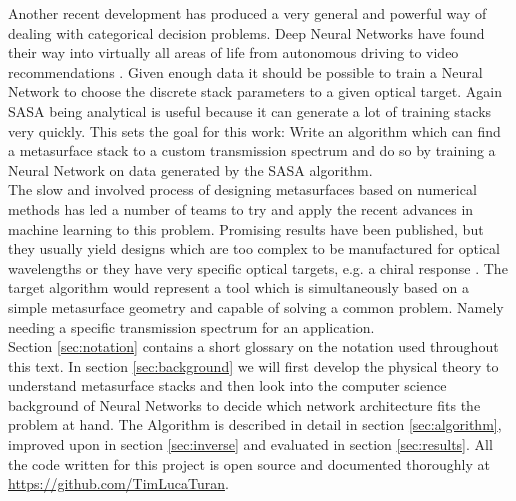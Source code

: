 \indent
Another recent development has produced a very general and powerful way of dealing with categorical decision problems. Deep Neural Networks have found their way into virtually all areas of life from autonomous driving \cite{Dequaire2016} to video recommendations \cite{youtube}. Given enough data it should be possible to train a Neural Network to choose the discrete stack parameters to a given optical target. Again SASA being analytical is useful because it can generate a lot of training stacks very quickly.
This sets the goal for this work: Write an algorithm which can find a metasurface stack to a custom transmission spectrum and do so by training a Neural Network on data generated by the SASA algorithm.
\\

\indent
The slow and involved process of designing metasurfaces based on numerical methods has led a number of teams to try and apply the recent advances in machine learning to this problem. Promising results have been published, but they usually yield designs which are too complex to be manufactured for optical wavelengths  or they have very specific optical targets, e.g. a chiral response \cite{Ma2018}. The target algorithm would represent a tool which is simultaneously based on a simple metasurface geometry and capable of solving a common problem. Namely needing a specific transmission spectrum for an application.
\\

\indent
Section \ref{sec:notation} contains a short glossary on the notation used throughout this text.
In section \ref{sec:background} we will first develop the physical theory to understand metasurface stacks and then look into the computer science background of Neural Networks to decide which network architecture fits the problem at hand. 
The Algorithm is described in detail in section \ref{sec:algorithm}, improved upon in section \ref{sec:inverse} and evaluated in section \ref{sec:results}.
All the code written for this project is open source and documented thoroughly at \url{https://github.com/TimLucaTuran}.
